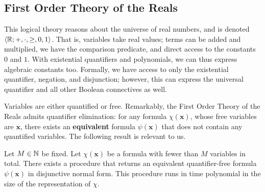 \subsection{First Order Theory of the Reals}
This logical theory reasons about the universe of real numbers, and is denoted $\langle\mathbb{R}; +, \cdot, \ge, 0, 1\rangle$. That is, variables take real values; terms can be added and multiplied, we have the comparison predicate, and direct access to the constants $0$ and $1$. With existential quantifiers and polynomials, we can thus express algebraic constants too. Formally, we have access to only the existential quantifier, negation, and disjunction; however, this can express the universal quantifier and all other Boolean connectives as well.

Variables are either quantified or free. Remarkably, the First Order Theory of the Reals admits quantifier elimination: for any formula $\chi(\mathbf{x})$, whose free variables are $\mathbf{x}$, there exists an \textbf{equivalent} formula $\psi(\mathbf{x})$ that does not contain any quantified variables. The following result is relevant to us.
\begin{theorem}
\label{thm:renegar}
Let $M \in \mathbb{N}$ be fixed. Let $\chi(\mathbf{x})$ be a formula with fewer than $M$ variables in total. There exists a procedure that returns an equivalent quantifier-free formula $\psi(\mathbf{x})$ in disjunctive normal form. This procedure runs in time polynomial in the size of the representation of $\chi$.
\end{theorem} 
